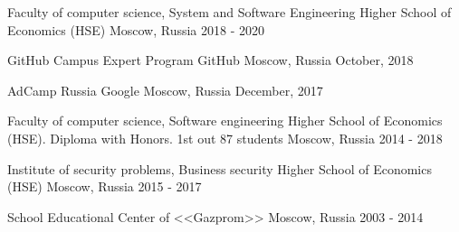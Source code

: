 

\cventryeducation
{Faculty of computer science, System and Software Engineering} %
{Higher School of Economics (HSE)} %
{Moscow, Russia} %
{2018 - 2020} %

\cventryeducation
{GitHub Campus Expert Program} %
{GitHub} %
{Moscow, Russia} %
{October, 2018} %

\cventryeducation
{AdCamp Russia} %
{Google} %
{Moscow, Russia} %
{December, 2017} %

\cventryeducation
{Faculty of computer science, Software engineering} %
{Higher School of Economics (HSE). Diploma with Honors. 1st out 87 students} %
{Moscow, Russia} %
{2014 - 2018} %

\cventryeducation
{Institute of security problems, Business security} %
{Higher School of Economics (HSE)} %
{Moscow, Russia} %
{2015 - 2017} %

\cventryeducation
{School} %
{Educational Center of <<Gazprom>>} %
{Moscow, Russia} %
{2003 - 2014} %


